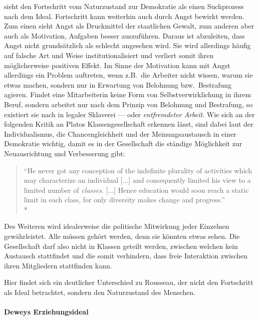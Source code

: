 \citeauthor{Dewey2010} sieht den Fortschritt vom Naturzustand zur Demokratie als einen Suchprozess nach dem Ideal.
Fortschritt kann weiterhin auch durch Angst bewirkt werden.
Zum einen sieht \citeauthor{Dewey2010} Angst als Druckmittel der staatlichen Gewalt, zum anderen aber auch als Motivation, Aufgaben besser auszuführen.
Daraus ist abzuleiten, dass Angst nicht grundsätzlich als schlecht angesehen wird.
Sie wird allerdings häufig auf falsche Art und Weise institutionalisiert und verliert somit ihren möglicherweise positiven Effekt.
Im Sinne der Motivation kann mit Angst allerdings ein Problem auftreten, wenn z.B.\ die Arbeiter nicht wissen, warum sie etwas machen, sondern nur in Erwartung von Belohnung bzw.\ Bestrafung agieren.
Findet eine Mitarbeiterin keine Form von Selbstverwirklichung in ihrem Beruf, sondern arbeitet nur nach dem Prinzip von Belohnung und Bestrafung, so existiert sie nach \citeauthor{Dewey2010} in legaler Sklaverei --- oder \emph{entfremdeter Arbeit}.
Wie sich an der folgenden Kritik an Platos Klassengesellschaft erkennen lässt, sind dabei laut \citeauthor{Dewey2010} der Individualismus, die Chancengleichheit und der Meinungsaustausch in einer Demokratie wichtig, damit es in der Gesellschaft die ständige Möglichkeit zur Neuausrichtung und Verbesserung gibt:

\begin{quote}
	``He never got any conception of the indefinite plurality of activities which may characterize an individual [...] and consequently limited his view to a limited number of \emph{classes}. [...]
	Hence education would soon reach a static limit in each class, for only diversity makes change and progress.''\\*
	\parencite[95f.]{Dewey-1916}
\end{quote}

Des Weiteren wird idealerweise die politische Mitwirkung jeder Einzelnen gewährleistet.
Alle müssen gehört werden, denn sie könnten etwas sehen.
Die Gesellschaft darf also nicht in Klassen geteilt werden, zwischen welchen kein Austausch stattfindet und die somit verhindern, dass freie Interaktion zwischen ihren Mitgliedern stattfinden kann.

Hier findet sich ein deutlicher Unterschied zu Rousseau, der nicht den Fortschritt als Ideal betrachtet, sondern den Naturzustand des Menschen.


\paragraph{Deweys Erziehungsideal}


